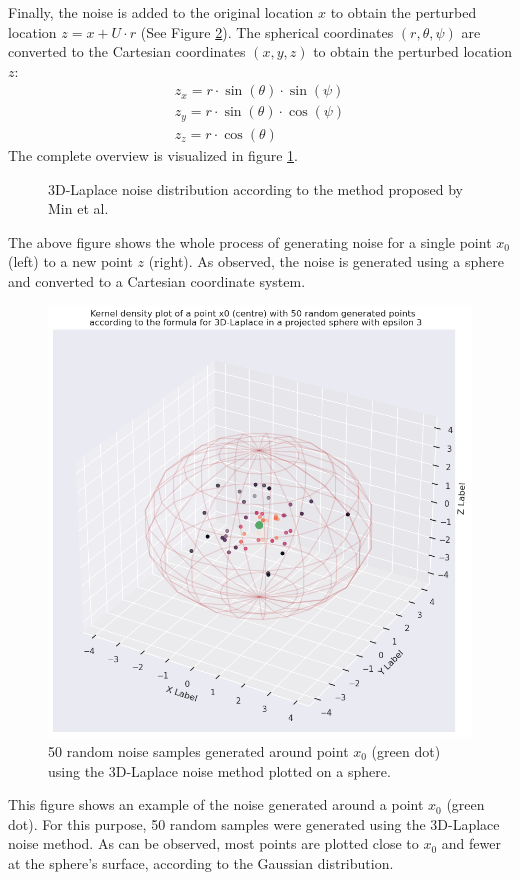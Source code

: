 Finally, the noise is added to the original location $x$ to obtain the perturbed location $z = x + U \cdot r$ (See Figure \ref{fig:3d-laplace-noise}).
The spherical coordinates $(r, \theta, \psi)$ are converted to the Cartesian coordinates $(x, y, z)$ to obtain the perturbed location $z$:
\begin{align*}
  z_x = r \cdot \sin(\theta) \cdot \sin(\psi) \\
  z_y = r \cdot \sin(\theta) \cdot \cos(\psi) \\
  z_z = r \cdot \cos(\theta)
  \label{eq:3d-cartesian}
\end{align*}
The complete overview is visualized in figure \ref{fig:3d-laplace}.
\begin{figure}[H]
  
  \caption{3D-Laplace noise distribution according to the method proposed by Min et al. \citep{9646489}}
  \label{fig:3d-laplace}
\end{figure}
The above figure shows the whole process of generating noise for a single point $x_0$ (left) to a new point $z$ (right).
As observed, the noise is generated using a sphere and converted to a Cartesian coordinate system.
\newpage
\begin{figure}[H]
  \includegraphics[width=1\textwidth]{TheorethicalFramework/ND-Laplace/Images/3d_laplace_noise.png}
  \caption{50 random noise samples generated around point $x_0$ (green dot) using the 3D-Laplace noise method \citep{9646489} plotted on a sphere.}
  \label{fig:3d-laplace-noise}
\end{figure}
This figure shows an example of the noise generated around a point $x_0$ (green dot).
For this purpose, 50 random samples were generated using the 3D-Laplace noise method.
As can be observed, most points are plotted close to $x_0$ and fewer at the sphere's surface, according to the Gaussian distribution.

